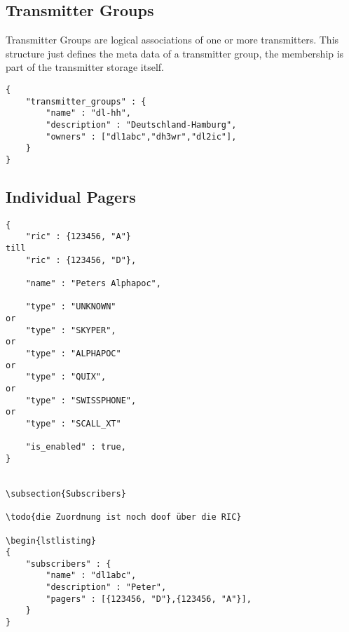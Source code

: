 \documentclass[a4paper]{article}
\begin{document}
\subsection{Transmitter Groups}
Transmitter Groups are logical associations of one or more transmitters. This structure just defines the meta data of a transmitter group, the membership is part of the transmitter storage itself.

\begin{lstlisting}
{
    "transmitter_groups" : {
        "name" : "dl-hh",
        "description" : "Deutschland-Hamburg",
        "owners" : ["dl1abc","dh3wr","dl2ic"],
    }
}
\end{lstlisting}

\subsection{Individual Pagers}
\begin{lstlisting}
{
	"ric" : {123456, "A"}
till
	"ric" : {123456, "D"},

	"name" : "Peters Alphapoc",

	"type" : "UNKNOWN"
or
	"type" : "SKYPER",
or
	"type" : "ALPHAPOC"
or
	"type" : "QUIX",
or
	"type" : "SWISSPHONE",
or
	"type" : "SCALL_XT"

	"is_enabled" : true,
}

    
\subsection{Subscribers}

\todo{die Zuordnung ist noch doof über die RIC}

\begin{lstlisting}
{
    "subscribers" : {
        "name" : "dl1abc",
        "description" : "Peter",
        "pagers" : [{123456, "D"},{123456, "A"}],
    }
}
\end{lstlisting}
\end{document}
